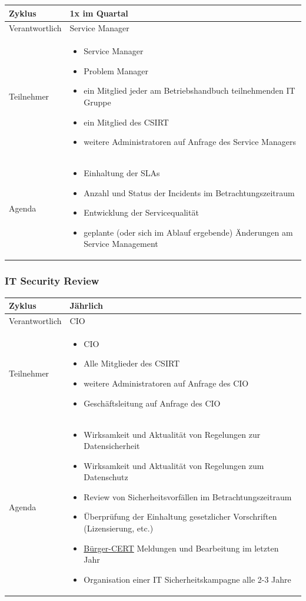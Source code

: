 \documentclass[]{article}
\begin{document}
\begin{longtable}{lp{8cm}}
\toprule
Zyklus & 1x im Quartal\tabularnewline
\midrule
Verantwortlich & Service Manager\tabularnewline
Teilnehmer & \begin{itemize}
\item
  Service Manager
\item
  Problem Manager
\item
  ein Mitglied jeder am Betriebshandbuch teilnehmenden IT Gruppe
\item
  ein Mitglied des CSIRT
\item
  weitere Administratoren auf Anfrage des Service Managers
\end{itemize}\tabularnewline
Agenda & \begin{itemize}
\item
  Einhaltung der SLAs
\item
  Anzahl und Status der Incidents im Betrachtungszeitraum
\item
  Entwicklung der Servicequalität
\item
  geplante (oder sich im Ablauf ergebende) Änderungen am Service
  Management
\end{itemize}\tabularnewline
\bottomrule
\end{longtable}
\newpage
\subsubsection{IT Security Review}\label{it-security-review}

\begin{longtable}{lp{8cm}}
\toprule
Zyklus & Jährlich\tabularnewline
\midrule
Verantwortlich & CIO\tabularnewline
Teilnehmer & \begin{itemize}
\item
  CIO
\item
  Alle Mitglieder des CSIRT
\item
  weitere Administratoren auf Anfrage des CIO
\item
  Geschäftsleitung auf Anfrage des CIO
\end{itemize}\tabularnewline
Agenda & \begin{itemize}
\item
  Wirksamkeit und Aktualität von Regelungen zur Datensicherheit
\item
  Wirksamkeit und Aktualität von Regelungen zum Datenschutz
\item
  Review von Sicherheitsvorfällen im Betrachtungszeitraum
\item
  Überprüfung der Einhaltung gesetzlicher Vorschriften (Lizensierung,
  etc.)
\item
  \href{https://www.buerger-cert.de/archive?type=WIDTechnicalWarning}{Bürger-CERT}
  Meldungen und Bearbeitung im letzten Jahr
\item
  Organisation einer IT Sicherheitskampagne alle 2-3 Jahre
\end{itemize}\tabularnewline
\bottomrule
\end{longtable}
\end{document}
